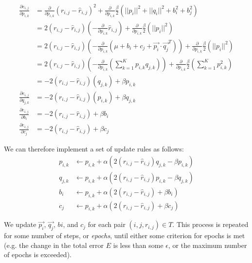 \documentclass[11pt]{amsart}
\begin{document}
\begin{align*}
\frac{\partial e_{i,j}}{\partial p_{i,k}} &= \frac{\partial}{\partial p_{i,k}} \left(r_{i,j} - \hat{r}_{i,j}\right)^2 + \frac{\partial}{\partial p_{i,k}} \frac{\beta}{2} \left( ||p_i||^2 + ||q_i||^2 + b_i^2 + b_j^2 \right) \\
    &= 2 \left(r_{i,j} - \hat{r}_{i,j}\right)  \left(-\frac{\partial}{\partial p_{i,k}} \hat{r}_{i,j}\right)  + \frac{\partial}{\partial p_{i,k}} \frac{\beta}{2} \left( ||p_i||^2\right) \\
    &= 2 \left(r_{i,j} - \hat{r}_{i,j}\right)  \left(-\frac{\partial}{\partial p_{i,k}} \left(\mu + b_i + c_j + \vec{p_i} \cdot \vec{q_j}^T \right) \right)  + \frac{\partial}{\partial p_{i,k}} \frac{\beta}{2} \left( ||p_i||^2 \right) \\
    &= 2 \left(r_{i,j} - \hat{r}_{i,j}\right)  \left(-\frac{\partial}{\partial p_{i,k}} \left( \sum_{k=1}^{K} p_{i,k} q_{j,k} \right) \right)  + \frac{\partial}{\partial p_{i,k}} \frac{\beta}{2} \left( \sum_{k=1}^{K} p_{i,k}^2 \right) \\
    &= -2 \left(r_{i,j} - \hat{r}_{i,j}\right)  \left(q_{j,k} \right) + \beta p_{i,k} \\
\frac{\partial e_{i,j}}{\partial q_{j,k}} &= -2 \left(r_{i,j} - \hat{r}_{i,j}\right)  \left(p_{i,k} \right) + \beta q_{j,k} \\
\frac{\partial e_{i,j}}{\partial b_{i}} &= -2 \left(r_{i,j} - \hat{r}_{i,j}\right) + \beta b_{i} \\
\frac{\partial e_{i,j}}{\partial c_{j}} &= -2 \left(r_{i,j} - \hat{r}_{i,j}\right) + \beta c_{j}
\end{align*}

We can therefore implement a set of update rules as follows:
\begin{align*}
p_{i,k} &\gets p_{i,k} + \alpha \left(2 \left(r_{i,j} - \hat{r}_{i,j}\right)  q_{j,k} - \beta p_{i,k} \right) \\
q_{j,k} &\gets p_{i,k} + \alpha \left(2 \left(r_{i,j} - \hat{r}_{i,j}\right)  p_{i,k} - \beta q_{j,k} \right) \\
b_{i}   &\gets p_{i,k} + \alpha \left(2 \left(r_{i,j} - \hat{r}_{i,j}\right)          + \beta b_{i}   \right) \\
c_{j}   &\gets p_{i,k} + \alpha \left(2 \left(r_{i,j} - \hat{r}_{i,j}\right)          + \beta c_{j}   \right)
\end{align*}

We update $\vec{p_i}$, $\vec{q_j}$, $b{i}$, and $c_{j}$ for each pair $(i, j, r_{i,j}) \in T$. This process is repeated for some number of steps, or \emph{epochs}, until either some criterion for epochs is met (e.g. the change in the total error $E$ is less than some $\epsilon$, or the maximum number of epochs is exceeded). 
\end{document}
